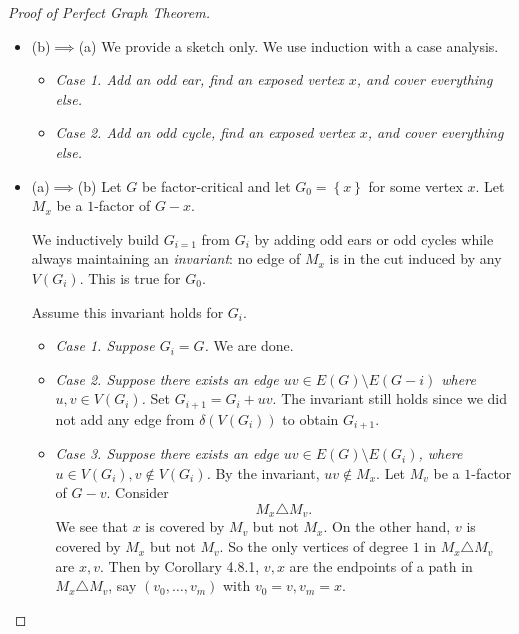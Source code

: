 \documentclass[co342]{subfiles}
\begin{document}
    \begin{proof}[Proof of Perfect Graph Theorem]
        \begin{itemize}
            \item (b)$\implies$(a) We provide a sketch only. We use induction with a case analysis.

                \begin{itemize}
                    \item \textit{Case 1. Add an odd ear, find an exposed vertex $x$, and cover everything else.}
                    \item \textit{Case 2. Add an odd cycle, find an exposed vertex $x$, and cover everything else.}
                \end{itemize} 

            \item (a)$\implies$(b) Let $G$ be factor-critical and let $G_0 = \left\lbrace x \right\rbrace$ for some vertex $x$. Let $M_x$ be a $1$-factor of $G-x$.

                We inductively build $G_{i=1}$ from $G_i$ by adding odd ears or odd cycles while always maintaining an \textit{invariant}: no edge of $M_x$ is in the cut induced by any $V\left( G_i \right)$. This is true for $G_0$.

                Assume this invariant holds for $G_i$.
                \begin{itemize}
                    \item \textit{Case 1. Suppose $G_i=G$.} We are done.

                    \item \textit{Case 2. Suppose there exists an edge $uv\in E\left( G \right)\setminus E\left( G-i \right)$ where $u,v\in V\left( G_i \right)$.} Set $G_{i+1}=G_i+uv$. The invariant still holds since we did not add any edge from $\delta\left( V\left( G_i \right) \right)$ to obtain $G_{i+1}$.

                    \item \textit{Case 3. Suppose there exists an edge $uv\in E\left( G \right)\setminus E\left( G_i \right)$, where $u\in V\left( G_i \right), v\notin V\left( G_i \right)$.} By the invariant, $uv\notin M_x$. Let $M_v$ be a $1$-factor of $G-v$. Consider
                        \begin{equation*}
                            M_x\triangle M_v.
                        \end{equation*}
                        We see that $x$ is covered by $M_v$ but not $M_x$. On the other hand, $v$ is covered by $M_x$ but not $M_v$. So the only vertices of degree $1$ in $M_x\triangle M_v$ are $x,v$. Then by Corollary 4.8.1, $v,x$ are the endpoints of a path in $M_x\triangle M_v$, say $\left( v_0,\ldots,v_m \right)$ with $v_0=v, v_m=x$.


\end{itemize}
\end{itemize}
\end{proof}
\end{document}
